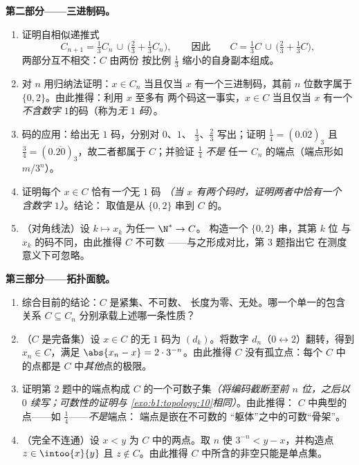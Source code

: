 \begin{problem}[{周末问题——康托尔三分集：
长度为零、不可数、完备，且 $C + C =
\intcc{0}{2}$}]
\medskip
\noindent\textbf{第二部分——三进制码。}
\begin{enumerate}[resume]
  \item 证明自相似递推式
        \[
        C_{n+1} = \tfrac13 C_n \,\cup\,
        \bigl(\tfrac23 + \tfrac13 C_n\bigr),
        \qquad\text{因此}\qquad
        C = \tfrac13 C \,\cup\, \bigl(\tfrac23 + \tfrac13
        C\bigr),
        \]
        两部分互不相交：$C$ 由两份
        按比例 $\frac13$ 缩小的自身副本组成。
  \item 对 $n$ 用归纳法证明：$x \in C_n$ 当且仅当
        $x$ 有一个三进制码，其前 $n$ 位数字属于
        $\{0, 2\}$。由此推得：利用 $x$ 至多有
        两个码这一事实，$x \in C$ 当且仅当 $x$ 有一个
        \emph{不含数字 $1$}的码（称为\emph{无 $1$ 码}）。
  \item 码的应用：给出无 $1$ 码，分别对 $0$、$1$、
        $\frac13$、$\frac23$ 写出；证明 $\frac14 = (0.\overline{02})_3$
        且 $\frac34 = (0.\overline{20})_3$，故二者都属于
        $C$；并验证 $\frac14$ \emph{不是}
        任一 $C_n$ 的端点（端点形如 $m/3^n$）。
  \item 证明每个 $x \in C$ 恰有\emph{一个}无 $1$ 码
        \emph{（当 $x$ 有两个码时，证明两者中恰有一个
        含数字 $1$）}。结论：
        取值是从 $\{0,2\}$ 串到
        $C$ 的。
  \item （对角线法）设 $k \mapsto x_k$ 为任一 $\N^* \to C$。
        构造一个 $\{0, 2\}$ 串，其第 $k$ 位
        与 $x_k$ 的码不同，由此推得 $C$ 不可数
——与之形成对比，第 3 题指出它
        在测度意义下可忽略。
\end{enumerate}

\medskip
\noindent\textbf{第三部分——拓扑面貌。}
\begin{enumerate}[resume]
  \item 综合目前的结论：$C$ 是紧集、不可数、
        长度为零、无处。哪一个单一的包含关系
        $C \subseteq C_n$ 分别承载上述哪一条性质？
  \item （$C$ 是完备集）设 $x \in C$ 的无 $1$ 码为
        $(d_k)$。将数字 $d_n$（$0 \leftrightarrow
        2$）翻转，得到 $x_n \in C$，满足 $\abs{x_n - x} = 2 \cdot
        3^{-n}$。由此推得 $C$ 没有孤立点：每个
        $C$ 中的点都是 $C$ 中\emph{其他}点的极限。
  \item 证明第 2 题中的端点构成
        $C$ 的一个可数子集\emph{（将编码截断至前 $n$
        位，之后以 $0$ 续写；可数性的证明与
        \cref{exo:b1:topology:10}相同）}。由此推得：
        $C$ 中典型的点——如 $\frac14$——\emph{不是}端点：
        端点是嵌在不可数的
        “躯体”之中的可数“骨架”。
  \item （完全不连通）设 $x < y$ 为 $C$ 中的两点。取 $n$
        使 $3^{-n} < y - x$，并构造点 $z \in
        \intoo{x}{y}$ 且 $z \notin C$。由此推得
        $C$ 中所含的非空只能是单点集。
\end{enumerate}


\end{problem}
